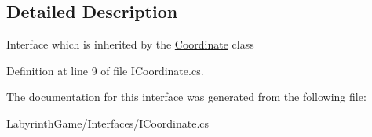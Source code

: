 \subsection{Detailed Description}
Interface which is inherited by the \hyperlink{class_labyrinth_game_1_1_coordinate}{Coordinate} class 



Definition at line 9 of file I\+Coordinate.\+cs.



The documentation for this interface was generated from the following file\+:\begin{DoxyCompactItemize}
\item 
Labyrinth\+Game/\+Interfaces/I\+Coordinate.\+cs\end{DoxyCompactItemize}
